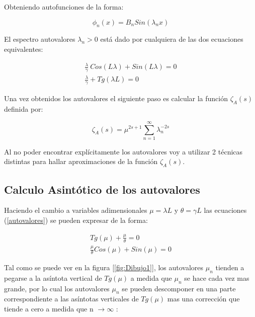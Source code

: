 Obteniendo autofunciones de la forma:

\begin{equation}
\phi _n (x) = 
B _n Sin( \lambda _n x )
\end{equation}

El espectro autovalores $\lambda _n > 0 $ está dado por  cualquiera de las dos ecuaciones equivalentes: 

\begin{equation}
\begin{array}{cc}
    \frac{\lambda}{\gamma}  \ Cos( L \lambda ) +   Sin( L \lambda ) = 0 \\
    \frac{\lambda}{\gamma}  + Tg(\lambda L )  = 0 
\label{autovalores}
\end{array}
\end{equation}



Una vez obtenidos los autovalores el siguiente paso es calcular la función $\zeta _A (s) $ definida por:

\begin{equation}
    \zeta _ {A } (s) = \mu ^{2s+1} \sum_{n = 1} ^{ \infty } \lambda _n ^ {-2 s}
\end{equation}

Al no poder encontrar explícitamente los autovalores voy a utilizar 2 técnicas distintas para hallar aproximaciones de la función $\zeta _A (s)$.

\subsection{Calculo Asintótico de los autovalores}


Haciendo el cambio a variables adimensionales $\mu = \lambda L $ y $\theta = \gamma L $ las ecuaciones (\ref{autovalores}) se pueden expresar de la forma:

\begin{equation}
\begin{array}{c}
    Tg(\mu) + \frac{\mu}{\theta} = 0 \\
    \frac{\mu}{\theta} Cos( \mu ) + Sin( \mu ) = 0
\end{array}
\label{eq.asintota}
\end{equation}

Tal como se puede ver en la figura [\ref{fig:Dibujo1}], los autovalores $\mu _n$ tienden a pegarse a la asíntota vertical de $ Tg ( \mu ) $ a medida que $\mu _n$ se hace cada vez mas grande, por lo cual los autovalores $\mu _n$ se pueden descomponer en una parte correspondiente a las asíntotas verticales de $Tg( \mu )$ mas una corrección que tiende a cero a medida que n  $ \rightarrow \infty$ :

